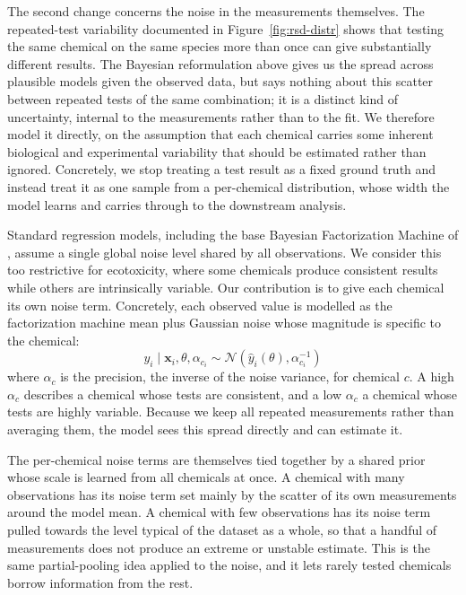 The second change concerns the noise in the measurements themselves. The repeated-test variability documented in Figure~\ref{fig:rsd-distr} shows that testing the same chemical on the same species more than once can give substantially different results. The Bayesian reformulation above gives us the spread across plausible models given the observed data, but says nothing about this scatter between repeated tests of the same combination; it is a distinct kind of uncertainty, internal to the measurements rather than to the fit. We therefore model it directly, on the assumption that each chemical carries some inherent biological and experimental variability that should be estimated rather than ignored. Concretely, we stop treating a test result as a fixed ground truth and instead treat it as one sample from a per-chemical distribution, whose width the model learns and carries through to the downstream analysis.


Standard regression models, including the base Bayesian Factorization Machine of \citet{rendle2011bayesian}, assume a single global noise level shared by all observations. We consider this too restrictive for ecotoxicity, where some chemicals produce consistent results while others are intrinsically variable. Our contribution is to give each chemical its own noise term. Concretely, each observed value is modelled as the factorization machine mean plus Gaussian noise whose magnitude is specific to the chemical:
\begin{equation}
    y_i \mid \mathbf{x}_i, \theta, \alpha_{c_i} \sim \mathcal{N}\left( \hat{y}_i(\theta), \alpha_{c_i}^{-1} \right)
    \label{eq:likelihood}
\end{equation}
where $\alpha_c$ is the precision, the inverse of the noise variance, for chemical $c$. A high $\alpha_c$ describes a chemical whose tests are consistent, and a low $\alpha_c$ a chemical whose tests are highly variable. Because we keep all repeated measurements rather than averaging them, the model sees this spread directly and can estimate it.

The per-chemical noise terms are themselves tied together by a shared prior whose scale is learned from all chemicals at once. A chemical with many observations has its noise term set mainly by the scatter of its own measurements around the model mean. A chemical with few observations has its noise term pulled towards the level typical of the dataset as a whole, so that a handful of measurements does not produce an extreme or unstable estimate. This is the same partial-pooling idea applied to the noise, and it lets rarely tested chemicals borrow information from the rest.

